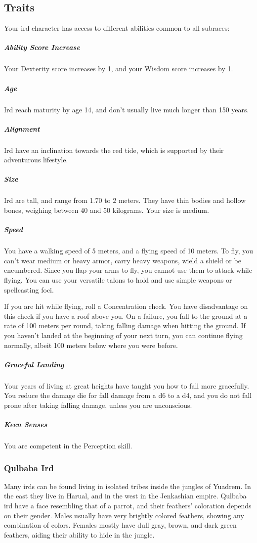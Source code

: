 \subsection*{Traits}
    Your ird character has access to different abilities common to all subraces:

    \subparagraph{Ability Score Increase} Your Dexterity score increases by 1, and your Wisdom score increases by 1.

    \subparagraph{Age} Ird reach maturity by age 14, and don't usually live much longer than 150 years.

    \subparagraph{Alignment} Ird have an inclination towards the red tide, which is supported by their adventurous lifestyle.

    \subparagraph{Size} Ird are tall, and range from 1.70 to 2 meters.
    They have thin bodies and hollow bones, weighing between 40 and 50 kilograms.
    Your size is medium.

    \subparagraph{Speed} You have a walking speed of 5 meters, and a flying speed of 10 meters.
    To fly, you can't wear medium or heavy armor, carry heavy weapons, wield a shield or be encumbered.
    Since you flap your arms to fly, you cannot use them to attack while flying.
    You can use your versatile talons to hold and use simple weapons or spellcasting foci.

    If you are hit while flying, roll a Concentration check.
    You have disadvantage on this check if you have a roof above you.
    On a failure, you fall to the ground at a rate of 100 meters per round, taking falling damage when hitting the ground.
    If you haven't landed at the beginning of your next turn, you can continue flying normally, albeit 100 meters below where you were before.

    \subparagraph{Graceful Landing} Your years of living at great heights have taught you how to fall more gracefully.
    You reduce the damage die for fall damage from a d6 to a d4, and you do not fall prone after taking falling damage, unless you are unconscious.

    \subparagraph{Keen Senses} You are competent in the Perception skill.

\subsubsection{Qulbaba Ird}
    Many irds can be found living in isolated tribes inside the jungles of Yuadrem.
    In the east they live in Harual, and in the west in the Jenkashian empire.
    Qulbaba ird have a face resembling that of a parrot, and their feathers' coloration depends on their gender.
    Males usually have very brightly colored feathers, showing any combination of colors.
    Females mostly have dull gray, brown, and dark green feathers, aiding their ability to hide in the jungle.

